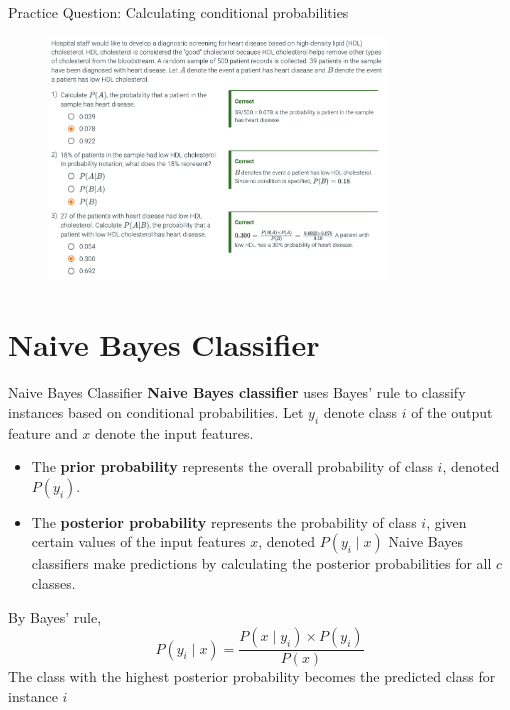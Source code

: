 \documentclass[10pt,dvipsnames]{beamer}
\begin{document}
\begin{frame}{Practice Question: Calculating conditional probabilities}
    \begin{figure}[ht]
        \centering
        \includegraphics[width=0.8\textwidth]{imgs/nb_7.png}
    \end{figure}
\end{frame}
\section{Naive Bayes Classifier}
\begin{frame}{Naive Bayes Classifier}
	\textbf{Naive Bayes classifier} uses Bayes' rule to classify instances based on conditional probabilities. Let \(y_{i}\) denote class \(i\) of the output feature
	and \(x\) denote the input features. 
	\begin{itemize}
		\item The \textbf{prior probability} represents the overall probability of class \(i\), denoted \(P\left(y_{i}\right)\). 
		
		\item The \textbf{posterior probability} represents the probability of class \(i\), given certain values of the input features \(x\), denoted \(P\left(y_{i} \mid x\right)\) Naive Bayes classifiers make predictions by calculating the posterior probabilities for all \(c\) classes.
	\end{itemize}
	 By Bayes' rule,
	$$
	P\left(y_{i} \mid x\right)=\frac{P\left(x \mid y_{i}\right) \times P\left(y_{i}\right)}{P(x)}
	$$
	The class with the highest posterior probability becomes the predicted class for instance \(i\)
\end{frame}
\end{document}
